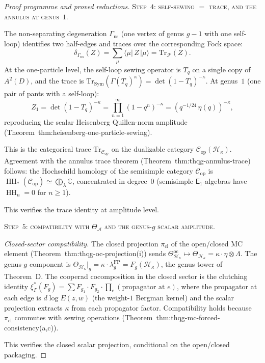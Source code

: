 \documentclass[11pt]{article}
\newcommand{\cA}{\mathcal{A}}
\newcommand{\cC}{\mathcal{C}}
\newcommand{\cH}{\mathcal{H}}
\newcommand{\C}{\mathbb{C}}
\newcommand{\cF}{\mathcal{F}}
\newcommand{\Eone}{\mathsf{E}_1}
\newcommand{\HH}{\operatorname{HH}}
\begin{document}
\begin{proof}[Proof programme and proved reductions]
\medskip
\noindent\textsc{Step~$4$: self-sewing $=$ trace, and the
annulus at genus~$1$.}

The non-separating degeneration $\Gamma_{\mathrm{ns}}$
(one vertex of genus $g{-}1$ with one self-loop) identifies
two half-edges and traces over the corresponding Fock space:
\[
  \delta_{\Gamma_{\mathrm{ns}}}(Z) = \sum_\mu
  \langle\mu|\,Z\,|\mu\rangle = \mathrm{Tr}_\cF(Z).
\]
At the one-particle level, the self-loop sewing operator is
$T_q$ on a single copy of $A^2(D)$, and the trace is
$\mathrm{Tr}_{\mathrm{Sym}}(\Gamma(T_q)^\kappa)
= \det(1 - T_q)^{-\kappa}$.  At genus~$1$ (one pair of
pants with a self-loop):
\[
  Z_1 = \det(1 - T_q)^{-\kappa}
  = \prod_{n=1}^\infty (1 - q^n)^{-\kappa}
  = (q^{-1/24}\,\eta(q))^{-\kappa},
\]
reproducing the scalar Heisenberg Quillen-norm amplitude
(Theorem~\textup{thm:heisenberg-one-particle-sewing}).

This is the categorical trace $\mathrm{Tr}_{\cC_{\mathrm{op}}}$
on the dualizable category $\cC_{\mathrm{op}}(\cH_\kappa)$.
Agreement with the annulus trace theorem
(Theorem~\textup{thm:thqg-annulus-trace}) follows: the
Hochschild homology of the semisimple category
$\cC_{\mathrm{op}}$ is
$\HH_*(\cC_{\mathrm{op}}) \simeq \bigoplus_\lambda \C$,
concentrated in degree~$0$ (semisimple $\Eone$-algebras have
$\HH_n = 0$ for $n \geq 1$).

This verifies the trace identity at amplitude level.

\medskip
\noindent\textsc{Step~$5$: compatibility with $\Theta_\cA$
and the genus-$g$ scalar amplitude.}

\emph{Closed-sector compatibility.}  The closed projection
$\pi_{\mathrm{cl}}$ of the open/closed MC element
(Theorem~\textup{thm:thqg-oc-projection(i)}) sends
$\Theta^{\mathrm{oc}}_{\cH_\kappa} \mapsto
\Theta_{\cH_\kappa} = \kappa \cdot \eta \otimes \Lambda$.
The genus-$g$ component is
$\Theta_{\cH_\kappa}|_g = \kappa \cdot \lambda_g^{\mathrm{FP}}
= F_g(\cH_\kappa)$, the genus tower of Theorem~D.  The
cooperad cocomposition in the closed sector is the clutching
identity $\xi^*_\Gamma(F_g) = \sum F_{g_1} \cdot F_{g_2}
\cdot \prod_e (\text{propagator at } e)$, where the propagator
at each edge is $d\log E(z,w)$ (the weight-$1$ Bergman kernel)
and the scalar projection extracts $\kappa$ from each
propagator factor.  Compatibility holds because
$\pi_{\mathrm{cl}}$ commutes with sewing operations
(Theorem~\textup{thm:thqg-mc-forced-consistency(a,c)}).

This verifies the closed scalar projection, conditional on the
open/closed packaging.


\end{proof}
\end{document}
